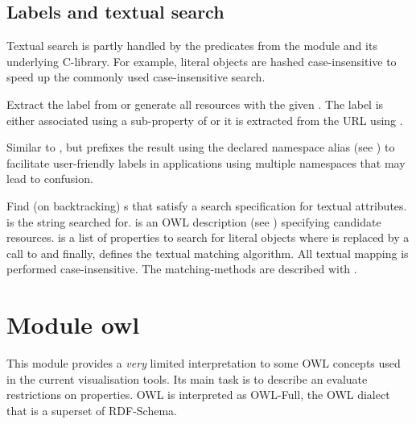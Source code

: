 \documentclass[11pt]{article}
\begin{document}
\subsection{Labels and textual search}

Textual search is partly handled by the predicates from the
 module and its underlying C-library.  For example,
literal objects are hashed case-insensitive to speed up the commonly
used case-insensitive search.

\begin{description}
Extract the label from  or generate all resources with
the given . The label is either associated using
a sub-property of  or it is extracted from the URL
using .

Similar to , but prefixes the result using the declared
namespace alias (see ) to facilitate user-friendly labels
in applications using multiple namespaces that may lead to confusion.

%
Find (on backtracking) s that satisfy a search
specification for textual attributes.   is the string
searched for.  is an OWL description (see )
specifying candidate resources.  is a list of properties
to search for literal objects where  is replaced by a
call to  and finally,  defines the textual
matching algorithm.  All textual mapping is performed case-insensitive.
The matching-methods are described with .
\end{description}



\section{Module owl}				\label{sec:owl}

%
This module provides a \emph{very} limited interpretation to some
OWL concepts used in the current visualisation tools.  Its main task
is to describe an evaluate restrictions on properties. OWL is
interpreted as OWL-Full, the OWL dialect that is a superset of
RDF-Schema.
\end{document}
